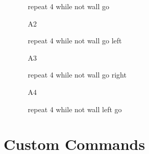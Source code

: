 \begin{enumerate}
\begin{enumerate}
\begin{bluecode}
repeat 4
    while not wall
        go
\end{bluecode}
\item[A2] 
\begin{bluecode}
repeat 4
    while not wall
        go
    left
\end{bluecode}
\item[A3] 
\begin{bluecode}
repeat 4
    while not wall
        go
    right
\end{bluecode}
\item[A4] 
\begin{bluecode}
repeat 4
    while not wall
        left
    go
\end{bluecode}
\end{enumerate}
\end{enumerate}


\section{Custom Commands}

